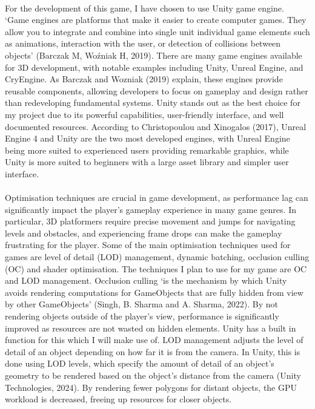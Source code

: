\documentclass[]{final_report}
\begin{document}
\paragraph{}
For the development of this game, I have chosen to use Unity game engine. `Game engines are platforms that make it easier to create computer games. They allow you to integrate and combine into single unit individual game elements such as animations, interaction with the user, or detection of collisions between objects' (Barczak M, Woźniak H, 2019). There are many game engines available for 3D development, with notable examples including Unity, Unreal Engine, and CryEngine. As Barczak and Wozniak (2019) explain, these engines provide reusable components, allowing developers to focus on gameplay and design rather than redeveloping fundamental systems. Unity stands out as the best choice for my project due to its powerful capabilities, user-friendly interface, and well documented resources. According to Christopoulou and Xinogalos (2017), Unreal Engine 4 and Unity are the two most developed engines, with Unreal Engine being more suited to experienced users providing remarkable graphics, while Unity is more suited to beginners with a large asset library and simpler user interface.
\paragraph{}
Optimisation techniques are crucial in game development, as performance lag can significantly impact the player's gameplay experience in many game genres. In particular, 3D platformers require precise movement and jumps for navigating levels and obstacles, and experiencing frame drops can make the gameplay frustrating for the player. Some of the main optimisation techniques used for games are level of detail (LOD) management, dynamic batching, occlusion culling (OC) and shader optimisation. The techniques I plan to use for my game are OC and LOD management. Occlusion culling ‘is the mechanism by which Unity avoids rendering computations for GameObjects that are fully hidden from view by other GameObjects’ (Singh, B. Sharma and A. Sharma, 2022). By not rendering objects outside of the player's view, performance is significantly improved as resources are not wasted on hidden elements. Unity has a built in function for this which I will make use of. LOD management adjusts the level of detail of an object depending on how far it is from the camera. In Unity, this is done using LOD levels, which specify the amount of detail of an object’s geometry to be rendered based on the object’s distance from the camera (Unity Technologies, 2024). By rendering fewer polygons for distant objects, the GPU workload is decreased, freeing up resources for closer objects.
\end{document}
